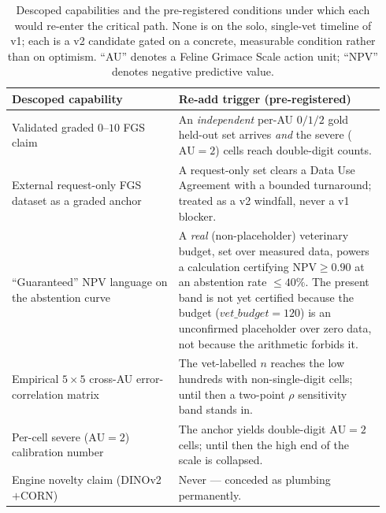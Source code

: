 \begin{table}[t]
\centering
\caption[Descoped capabilities and their pre-registered re-add triggers]{Descoped
capabilities and the pre-registered conditions under which each would re-enter the
critical path. None is on the solo, single-vet timeline of v1; each is a v2
candidate gated on a concrete, measurable condition rather than on optimism. ``AU''
denotes a Feline Grimace Scale action unit; ``NPV'' denotes negative predictive
value.}
\label{tab:concl-readd}
\small
\begin{tabular}{@{}p{0.42\linewidth} p{0.52\linewidth}@{}}
\toprule
\textbf{Descoped capability} & \textbf{Re-add trigger (pre-registered)} \\
\midrule
Validated graded $0$--$10$ FGS claim
  & An \emph{independent} per-AU $0/1/2$ gold held-out set arrives \emph{and} the
    severe ($\mathrm{AU}{=}2$) cells reach double-digit counts. \\
\addlinespace
External request-only FGS dataset as a graded anchor
  & A request-only set clears a Data Use Agreement with a bounded turnaround;
    treated as a v2 windfall, never a v1 blocker. \\
\addlinespace
``Guaranteed'' NPV language on the abstention curve
  & A \emph{real} (non-placeholder) veterinary budget, set over measured data,
    powers a calculation certifying $\mathrm{NPV} \geq 0.90$ at an abstention rate
    $\leq 40\%$. The present band is not yet certified because the budget
    ($\mathit{vet\_budget}{=}120$) is an unconfirmed placeholder over zero data,
    not because the arithmetic forbids it. \\
\addlinespace
Empirical $5\times 5$ cross-AU error-correlation matrix
  & The vet-labelled $n$ reaches the low hundreds with non-single-digit cells;
    until then a two-point $\rho$ sensitivity band stands in. \\
\addlinespace
Per-cell severe ($\mathrm{AU}{=}2$) calibration number
  & The anchor yields double-digit $\mathrm{AU}{=}2$ cells; until then the high
    end of the scale is collapsed. \\
\addlinespace
Engine novelty claim (\mbox{DINOv2$+$CORN})
  & Never --- conceded as plumbing permanently. \\
\bottomrule
\end{tabular}
\end{table}

